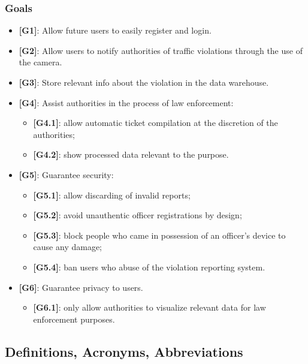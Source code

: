 \documentclass[12pt,a4paper]{article}
\begin{document}
\subsubsection{Goals}
\begin{itemize}
\item {\textbf[}\textbf{G1}{\textbf]}: Allow future users to easily register and login. 
\item {\textbf[}\textbf{G2}{\textbf]}: Allow users to notify authorities of traffic violations through the use of the camera.
\item {\textbf[}\textbf{G3}{\textbf]}: Store relevant info about the violation in the data warehouse.
\item {\textbf[}\textbf{G4}{\textbf]}: Assist authorities in the process of law enforcement:
\begin{itemize}
	 \item {\textbf[}\textbf{G4.1}{\textbf]}: allow automatic ticket compilation at the discretion of the authorities;
	\item {\textbf[}\textbf{G4.2}{\textbf]}: show processed data relevant to the purpose.
\end{itemize}
\item {\textbf[}\textbf{G5}{\textbf]}: Guarantee security: 
\begin{itemize}
	\item {\textbf[}\textbf{G5.1}{\textbf]}: allow discarding of invalid reports;
	\item {\textbf[}\textbf{G5.2}{\textbf]}: avoid unauthentic officer registrations by design;
	\item {\textbf[}\textbf{G5.3}{\textbf]}: block people who came in possession of an officer's device to cause any damage;
	\item {\textbf[}\textbf{G5.4}{\textbf]}: ban users who abuse of the violation reporting system.
\end{itemize}
\item {\textbf[}\textbf{G6}{\textbf]}: Guarantee privacy to users.
	\begin{itemize}
	\item {\textbf[}\textbf{G6.1}{\textbf]}: only allow authorities to visualize relevant data for law enforcement purposes.
	\end{itemize}
\end{itemize}
\subsection{Definitions,	Acronyms,	Abbreviations} 
\end{document}
